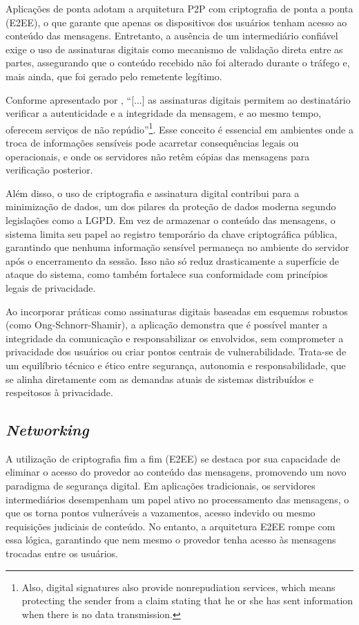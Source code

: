 Aplicações de ponta adotam a arquitetura \acs{P2P} com criptografia de
ponta a ponta (\acs{E2EE}), o que garante que apenas os dispositivos dos
usuários tenham acesso ao conteúdo das mensagens. Entretanto, a
ausência de um intermediário confiável exige o uso de assinaturas
digitais como mecanismo de validação direta entre as partes,
assegurando que o conteúdo recebido não foi alterado durante o
tráfego e, mais ainda, que foi gerado pelo remetente legítimo.

Conforme apresentado por , “[...] as assinaturas digitais permitem ao
destinatário verificar a autenticidade e a integridade da mensagem, e
ao mesmo tempo, oferecem serviços de não repúdio”\footnote{Also,
  digital signatures also provide nonrepudiation services, which means
  protecting the sender from a claim stating that he or she has sent
information when there is no data transmission.}. Esse conceito é
essencial em ambientes onde a troca de informações sensíveis pode
acarretar consequências legais ou operacionais, e onde os servidores
não retêm cópias das mensagens para verificação posterior.

Além disso, o uso de criptografia e assinatura digital contribui para
a minimização de dados, um dos pilares da proteção de dados
moderna segundo legislações como a \acf{LGPD}. Em vez de armazenar o
conteúdo das mensagens, o sistema
limita seu papel ao registro temporário da chave criptográfica
pública, garantindo que nenhuma informação sensível permaneça no
ambiente do servidor após o encerramento da sessão. Isso não só
reduz drasticamente a superfície de ataque do sistema, como
também fortalece sua conformidade com princípios legais de privacidade.

Ao incorporar práticas como assinaturas digitais baseadas em
esquemas robustos (como Ong-Schnorr-Shamir), a aplicação demonstra
que é possível manter a integridade da comunicação e responsabilizar
os envolvidos, sem comprometer a privacidade dos usuários ou criar
pontos centrais de vulnerabilidade. Trata-se de um equilíbrio
técnico e ético entre segurança, autonomia e responsabilidade, que se
alinha diretamente com as demandas atuais de sistemas distribuídos e
respeitosos à privacidade.

\subsection{\textit{Networking}}

A utilização de criptografia fim a fim (\acs{E2EE}) se destaca por sua
capacidade de eliminar o acesso do provedor ao conteúdo das
mensagens, promovendo um novo paradigma de segurança digital. Em
aplicações tradicionais, os servidores intermediários desempenham um
papel ativo no processamento das mensagens, o que os torna pontos
vulneráveis a vazamentos, acesso indevido ou mesmo requisições
judiciais de conteúdo. No entanto, a arquitetura \acs{E2EE} rompe com
essa lógica, garantindo que nem mesmo o provedor tenha acesso às
mensagens trocadas entre os usuários.


